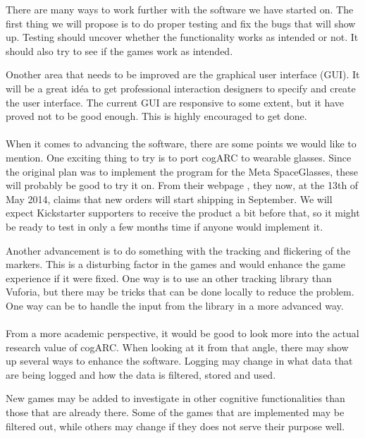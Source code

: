 There are many ways to work further with the software we have started on.
The first thing we will propose is to do proper testing and fix the bugs that
will show up. Testing should uncover whether the functionality works as 
intended or not. It should also try to see if the games work as intended.

Onother area that needs to be improved are the graphical user interface (GUI).
It will be a great id\'ea to get professional interaction designers to specify
and create the user interface. The current GUI are responsive to some extent, 
but it have proved not to be good enough. This is highly encouraged to get 
done.

\paragraph{}

When it comes to advancing the software, there are some points we would like 
to mention. One exciting thing to try is to port cogARC to wearable glasses.
Since the original plan was to implement the program for the \gls{Meta 
SpaceGlasses}, these will probably be good to try it on. From their webpage
\cite{MetaSpaceGlasses}, they now, at the 13th of May 2014, claims that new 
orders will start shipping in September. We will expect Kickstarter supporters 
to receive the product a bit before that, so it might be ready to test in only
a few months time if anyone would implement it.

Another advancement is to do something with the tracking and flickering of the 
markers. This is a disturbing factor in the games and would enhance the game
experience if it were fixed. One way is to use an other tracking library than
Vuforia, but there may be tricks that can be done locally to reduce the 
problem. One way can be to handle the input from the library in a more advanced
way.

\paragraph{}

From a more academic perspective, it would be good to look more into the actual
research value of cogARC. When looking at it from that angle, there may show up
several ways to enhance the software. Logging may change in what data that are
being logged and how the data is filtered, stored and used.

New games may be added to investigate in other cognitive functionalities than 
those that are already there. Some of the games that are implemented may be
filtered out, while others may change if they does not serve their purpose well.
